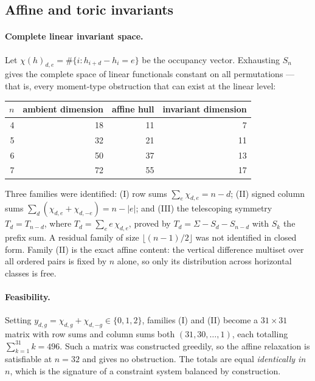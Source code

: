\documentclass[11pt,a4paper]{article}
\theoremstyle{definition}
\begin{document}
\subsection{Affine and toric invariants}
\label{sec:affine}

\paragraph{Complete linear invariant space.} Let $\chi(h)_{d,e}=\#\{i:
h_{i+d}-h_i=e\}$ be the occupancy vector. Exhausting $S_n$ gives the complete
space of linear functionals constant on all permutations --- that is, every
moment-type obstruction that can exist at the linear level:

\begin{center}
\begin{tabular}{@{}rrrr@{}}
\toprule
$n$ & ambient dimension & affine hull & invariant dimension \\
\midrule
4 & 18 & 11 & 7 \\
5 & 32 & 21 & 11 \\
6 & 50 & 37 & 13 \\
7 & 72 & 55 & 17 \\
\bottomrule
\end{tabular}
\end{center}

Three families were identified: (I) row sums $\sum_e\chi_{d,e}=n-d$; (II) signed
column sums $\sum_d(\chi_{d,e}+\chi_{d,-e})=n-|e|$; and (III) the telescoping
symmetry $T_d = T_{n-d}$, where $T_d=\sum_e e\,\chi_{d,e}$, proved by
$T_d=\Sigma - S_d - S_{n-d}$ with $S_k$ the prefix sum. A residual family of
size $\lfloor (n-1)/2\rfloor$ was not identified in closed form. Family (II) is
the exact affine content: the vertical difference multiset over all ordered pairs
is fixed by $n$ alone, so only its distribution across horizontal classes is
free.

\paragraph{Feasibility.} Setting $y_{d,g}=\chi_{d,g}+\chi_{d,-g}\in\{0,1,2\}$,
families (I) and (II) become a $31\times31$ matrix with row sums and column sums
both $(31,30,\dots,1)$, each totalling $\sum_{k=1}^{31}k=496$. Such a matrix was
constructed greedily, so the affine relaxation is satisfiable at $n=32$ and gives
no obstruction. The totals are equal \emph{identically in $n$}, which is the
signature of a constraint system balanced by construction.
\end{document}
